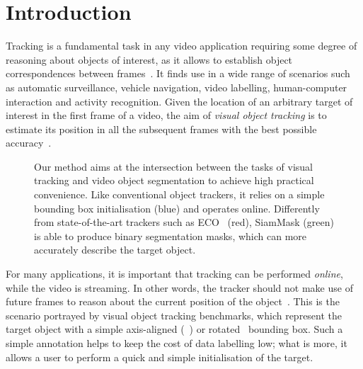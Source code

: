 \section{Introduction}
Tracking is a fundamental task in any video application requiring some degree of reasoning about objects of interest, as it allows to establish object correspondences between frames~\cite{makovski2008visual}. 
It finds use in a wide range of scenarios such as automatic surveillance, vehicle navigation, video labelling, human-computer interaction and activity recognition.
Given the location of an arbitrary target of interest in the first frame of a video, the aim of \emph{visual object tracking} is to estimate its position in all the subsequent frames with the best possible accuracy~\cite{smeulders2014visual}.

\begin{figure}[t]
\centering

\caption{
Our method aims at the intersection between the tasks of visual tracking and video object segmentation to achieve high practical convenience.
Like conventional object trackers, it relies on a simple bounding box initialisation (blue) and operates online.
Differently from state-of-the-art trackers such as ECO~\cite{danelljan2017eco} (red), SiamMask (green) is able to produce binary segmentation masks, which can more accurately describe the target object.
}
\label{fig:video_page1}
\vspace{-0.5cm}
\end{figure}

For many applications, it is important that tracking can be performed \emph{online}, while the video is streaming.
In other words, the tracker should not make use of future frames to reason about the current position of the object~\cite{kristan2016visual}.
This is the scenario portrayed by visual object tracking benchmarks, which represent the target object with a simple axis-aligned (\eg~\cite{wu2013online,valmadre2018long}) or rotated~\cite{kristan2016visual,VOT2018} bounding box.
Such a simple annotation helps to keep the cost of data labelling low; what is more, it allows a user to perform a quick and simple initialisation of the target.

